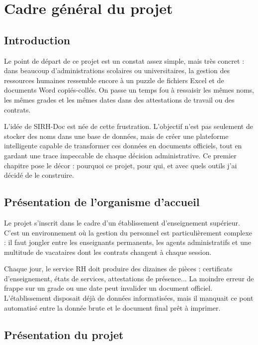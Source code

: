
\chapter{Cadre général du projet}

\section{Introduction}

Le point de départ de ce projet est un constat assez simple, mais très concret : dans beaucoup d'administrations scolaires ou universitaires, la gestion des ressources humaines ressemble encore à un puzzle de fichiers Excel et de documents Word copiés-collés. On passe un temps fou à ressaisir les mêmes noms, les mêmes grades et les mêmes dates dans des attestations de travail ou des contrats. 

L'idée de SIRH-Doc est née de cette frustration. L'objectif n'est pas seulement de stocker des noms dans une base de données, mais de créer une plateforme intelligente capable de transformer ces données en documents officiels, tout en gardant une trace impeccable de chaque décision administrative. Ce premier chapitre pose le décor : pourquoi ce projet, pour qui, et avec quels outils j'ai décidé de le construire.

\section{Présentation de l'organisme d'accueil}

Le projet s'inscrit dans le cadre d'un établissement d'enseignement supérieur. C'est un environnement où la gestion du personnel est particulièrement complexe : il faut jongler entre les enseignants permanents, les agents administratifs et une multitude de vacataires dont les contrats changent à chaque session.

Chaque jour, le service RH doit produire des dizaines de pièces : certificats d'enseignement, états de services, attestations de présence... La moindre erreur de frappe sur un grade ou une date peut invalider un document officiel. L'établissement disposait déjà de données informatisées, mais il manquait ce \og pont \fg{} automatisé entre la donnée brute et le document final prêt à imprimer.

\section{Présentation du projet}

